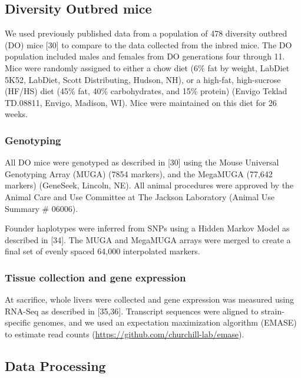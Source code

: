 \documentclass[10pt,letterpaper]{article}
\begin{document}
\hypertarget{diversity-outbred-mice}{%
\subsection{Diversity Outbred mice}\label{diversity-outbred-mice}}

We used previously published data from a population of 478 diversity
outbred (DO) mice {[}30{]} to compare to the data collected from the
inbred mice. The DO population included males and females from DO
generations four through 11. Mice were randomly assigned to either a
chow diet (6\% fat by weight, LabDiet 5K52, LabDiet, Scott Distributing,
Hudson, NH), or a high-fat, high-sucrose (HF/HS) diet (45\% fat, 40\%
carbohydrates, and 15\% protein) (Envigo Teklad TD.08811, Envigo,
Madison, WI). Mice were maintained on this diet for 26 weeks.

\hypertarget{genotyping}{%
\subsubsection{Genotyping}\label{genotyping}}

All DO mice were genotyped as described in {[}30{]} using the Mouse
Universal Genotyping Array (MUGA) (7854 markers), and the MegaMUGA
(77,642 markers) (GeneSeek, Lincoln, NE). All animal procedures were
approved by the Animal Care and Use Committee at The Jackson Laboratory
(Animal Use Summary \# 06006).

Founder haplotypes were inferred from SNPs using a Hidden Markov Model
as described in {[}34{]}. The MUGA and MegaMUGA arrays were merged to
create a final set of evenly spaced 64,000 interpolated markers.

\hypertarget{tissue-collection-and-gene-expression}{%
\subsubsection{Tissue collection and gene
expression}\label{tissue-collection-and-gene-expression}}

At sacrifice, whole livers were collected and gene expression was
measured using RNA-Seq as described in {[}35,36{]}. Transcript sequences
were aligned to strain-specific genomes, and we used an expectation
maximization algorithm (EMASE) to estimate read counts
(\url{https://github.com/churchill-lab/emase}).

\hypertarget{data-processing}{%
\subsection{Data Processing}\label{data-processing}}
\end{document}
